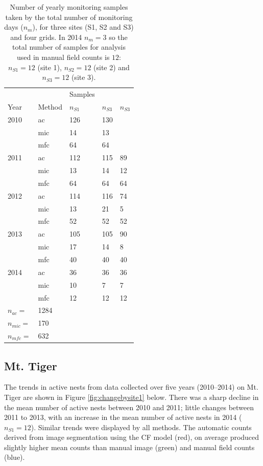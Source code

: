 \begin{table}[!htbp]\myfloatalign
\caption[Summary of monitoring samples.]{Number of yearly monitoring samples taken by the total number of monitoring days ($ n_{m} $), for three sites (S1, S2 and S3) and four grids. In 2014 $ n_{m} = 3 $ so the total number of samples for analysis used in manual field counts is $12$: $ n_{S1} = 12$ (site 1), $ n_{S2} = 12$ (site 2) and $ n_{S3} = 12$ (site 3).}\label{tab:summary-of-monitoring-samples}
\begin{tabular}{p{.6in}p{.6in}|p{.6in}p{.6in}p{.6in}} \toprule
 &	 & Samples &	 & \\
Year &	Method &	$ n_{S1} $ &	$ n_{S3} $ &	$ n_{S3} $ \\ \midrule
2010 &	ac &	126 &	130 &	 \\
 &	mic &	14 &	13 &	  \\
 &	mfc &	64 &	64 &		\\
2011 &	ac &	112 &	115 &	89  \\
 &	mic &	13 &	14 &	12 	 \\
 &	mfc &	64 &	64 &	64  \\
2012 &	ac &	114 &	116 &	74 \\
 &	mic &	13 &	21 &	5 	\\
 &	mfc &	52 &	52 &	52  \\
2013 &	ac &	105 &	105 &	90 \\
 &	mic &	17 &	14 &	8 	 \\
 &	mfc &	40 &	40 &	40 \\
2014 &	ac &	36 &	36 &	36  \\
 &	mic &	10 &	7 &	7  \\
 &	mfc &	12 &	12 &	12  \\
$ n_{ac} = $ & 1284	 &	 &	 &	 	 \\
$ n_{mic} = $ & 170	 &	 &	 &	 	 \\
$ n_{mfc} = $ &	632 &	 &	 &	 	 \\
\bottomrule
\end{tabular}
\end{table}

\subsection{Mt. Tiger}\label{sec:mt.-tiger}
The trends in active nests from data collected  over five years (2010--2014) on Mt. Tiger are shown in Figure \ref{fig:changebysite1} below. There was a sharp decline in the mean number of active nests between 2010 and 2011; little changes between 2011 to 2013, with an increase in the mean number of active nests in 2014 ($n_{S1} = 12$). Similar trends were displayed by all methods. The automatic counts derived from image segmentation using the CF model (red), on average produced slightly higher mean counts than manual image (green) and manual field counts (blue).

